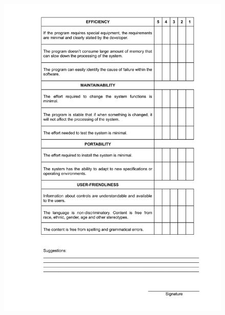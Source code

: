 \clearpage
\null\vfill
\begin{figure}[H]
	 \centering
	 \includegraphics[width=\textwidth]{figures/tech_eval_form_2.png}
	 \label{fig:tech_eval_form2}
\end{figure}
